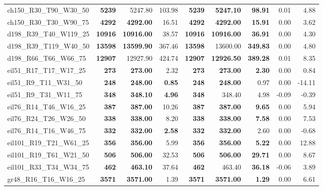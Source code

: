 \documentclass{singlecol-new}
\begin{document}
\begin{scriptsize}
\begin{longtable}{lrrrrrrrr}
		ch150\_R30\_T90\_W30\_50 & \textbf{5239} & 5247.80 & 103.98 & \textbf{5239} & \textbf{5247.10} & \textbf{98.91} & 0.01 & 4.88 \\
		ch150\_R30\_T30\_W90\_75 & \textbf{4292} & \textbf{4292.00} & 16.51 & \textbf{4292} & \textbf{4292.00} & \textbf{15.91} & 0.00 & 3.62 \\
		d198\_R39\_T40\_W119\_25 & \textbf{10916} & \textbf{10916.00} & 38.57 & \textbf{10916} & \textbf{10916.00} & \textbf{36.91} & 0.00 & 4.30 \\
		d198\_R39\_T119\_W40\_50 & \textbf{13598} & \textbf{13599.90} & 367.46 & \textbf{13598} & 13600.00 & \textbf{349.83} & 0.00 & 4.80 \\
		d198\_R66\_T66\_W66\_75 & \textbf{12907} & 12927.90 & 424.74 & \textbf{12907} & \textbf{12926.50} & \textbf{389.28} & 0.01 & 8.35 \\
		eil51\_R17\_T17\_W17\_25 & \textbf{273} & \textbf{273.00} & 2.32 & \textbf{273} & \textbf{273.00} & \textbf{2.30} & 0.00 & 0.84 \\
		eil51\_R9\_T11\_W31\_50 & \textbf{248} & \textbf{248.00} & \textbf{0.85} & \textbf{248} & \textbf{248.00} & 0.97 & 0.00 & -14.11 \\
		eil51\_R9\_T31\_W11\_75 & \textbf{348} & \textbf{348.10} & \textbf{4.96} & \textbf{348} & 348.40 & 4.98 & -0.09 & -0.39 \\
		eil76\_R14\_T46\_W16\_25 & \textbf{387} & \textbf{387.00} & 10.26 & \textbf{387} & \textbf{387.00} & \textbf{9.65} & 0.00 & 5.94 \\
		eil76\_R24\_T26\_W26\_50 & \textbf{338} & \textbf{338.00} & 8.20 & \textbf{338} & \textbf{338.00} & \textbf{7.58} & 0.00 & 7.53 \\
		eil76\_R14\_T16\_W46\_75 & \textbf{332} & \textbf{332.00} & \textbf{2.58} & \textbf{332} & \textbf{332.00} & 2.60 & 0.00 & -0.68 \\
		eil101\_R19\_T21\_W61\_25 & \textbf{356} & \textbf{356.00} & 5.99 & \textbf{356} & \textbf{356.00} & \textbf{5.22} & 0.00 & 12.88 \\
		eil101\_R19\_T61\_W21\_50 & \textbf{506} & \textbf{506.00} & 32.53 & \textbf{506} & \textbf{506.00} & \textbf{29.71} & 0.00 & 8.67 \\
		eil101\_R33\_T34\_W34\_75 & \textbf{462} & \textbf{463.10} & 37.64 & \textbf{462} & 463.40 & \textbf{36.18} & -0.06 & 3.89 \\
		gr48\_R16\_T16\_W16\_25 & \textbf{3571} & \textbf{3571.00} & 1.39 & \textbf{3571} & \textbf{3571.00} & \textbf{1.29} & 0.00 & 6.61 \\

\end{longtable}
\end{scriptsize}
\end{document}
